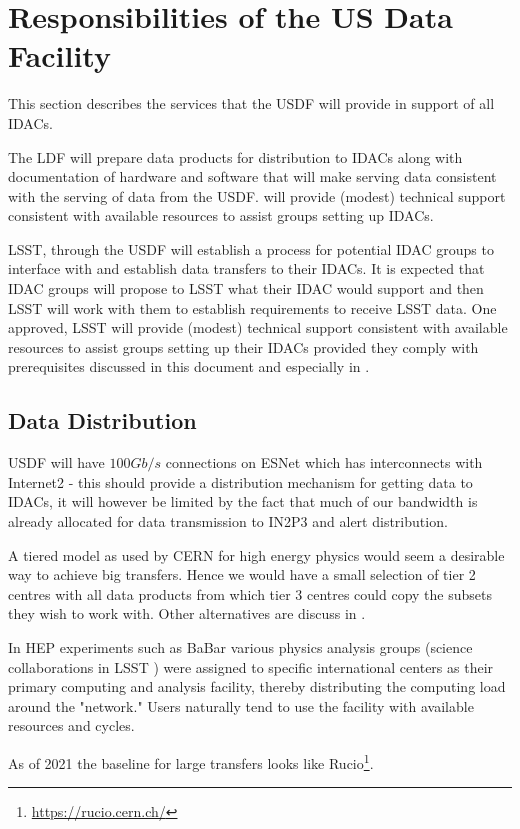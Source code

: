 \section{Responsibilities of the \gls{US} Data Facility}

This section describes the services that the USDF will provide in support of all  IDACs.

The \gls{LDF} will prepare data products for distribution to IDACs along with documentation of hardware and software that will make serving \RO data consistent with the serving of data from the USDF. \RO will provide (modest) technical support consistent with available resources to assist groups setting up IDACs.

LSST, through the USDF will establish a process for potential \gls{IDAC} groups to interface with and establish data transfers to their IDACs. It is expected that \gls{IDAC} groups will propose to \gls{LSST} what their \gls{IDAC} would support and then \gls{LSST} will work with them to establish requirements to receive \gls{LSST} data. One approved, \gls{LSST} will provide (modest) technical support consistent with available resources to assist groups setting up their IDACs provided they comply with prerequisites discussed in this document and especially in .

\subsection{Data Distribution} \label{sec:dist}

USDF will have $100Gb/s$ connections  on \gls{ESNet} which has interconnects with Internet2 - this should provide a distribution mechanism for getting data to IDACs, it will however be limited by the fact that much of our bandwidth is already allocated for data transmission to \gls{IN2P3} and alert distribution.

A tiered model as used by \gls{CERN} for high energy physics would seem a desirable way to achieve big transfers. Hence we would have a small selection of tier 2 centres with all data products from which tier 3 centres could copy the subsets they wish to work with.  Other alternatives are discuss in .

In \gls{HEP} experiments such as  BaBar various physics analysis groups (science collaborations in \gls{LSST} ) were assigned to specific international centers as their primary computing and analysis facility, thereby distributing the computing load around the "network." Users naturally tend to use the facility with available resources and cycles.

As of 2021 the baseline for large transfers looks like Rucio\footnote{\url{https://rucio.cern.ch/}}.


